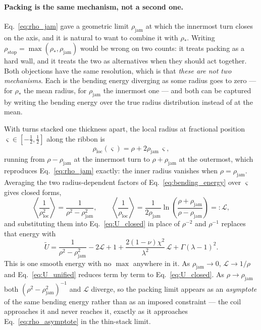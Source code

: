 \documentclass[11pt]{article}
\begin{document}
\paragraph{Packing is the same mechanism, not a second one.} Eq.~\eqref{eq:rho_jam}
gave a geometric limit $\rho_{\mathrm{jam}}$ at which the innermost turn closes on
the axis, and it is natural to want to combine it with $\rho_*$. Writing
$\rho_{\mathrm{stop}} = \max(\rho_*, \rho_{\mathrm{jam}})$ would be wrong on two
counts: it treats packing as a hard wall, and it treats the two as alternatives
when they should act together. Both objections have the same resolution, which is
that \emph{these are not two mechanisms}. Each is the bending energy diverging as
some radius goes to zero --- for $\rho_*$ the mean radius, for
$\rho_{\mathrm{jam}}$ the innermost one --- and both can be captured by writing
the bending energy over the true radius distribution instead of at the mean.

With turns stacked one thickness apart, the local radius at fractional position
$\varsigma \in \left[-\tfrac12, \tfrac12\right]$ along the ribbon is
\begin{equation}\label{eq:rho_local}
    \rho_{\mathrm{loc}}(\varsigma) = \rho + 2\rho_{\mathrm{jam}}\,\varsigma,
\end{equation}
running from $\rho - \rho_{\mathrm{jam}}$ at the innermost turn to
$\rho + \rho_{\mathrm{jam}}$ at the outermost, which reproduces
Eq.~\eqref{eq:rho_jam} exactly: the inner radius vanishes when
$\rho = \rho_{\mathrm{jam}}$. Averaging the two radius-dependent factors of
Eq.~\eqref{eq:bending_energy} over $\varsigma$ gives closed forms,
\begin{equation}\label{eq:rho_averages}
    \left\langle \frac{1}{\rho_{\mathrm{loc}}^{2}} \right\rangle
      = \frac{1}{\rho^{2} - \rho_{\mathrm{jam}}^{2}},
    \qquad
    \left\langle \frac{1}{\rho_{\mathrm{loc}}} \right\rangle
      = \frac{1}{2\rho_{\mathrm{jam}}}
        \ln\!\left(\frac{\rho + \rho_{\mathrm{jam}}}
          {\rho - \rho_{\mathrm{jam}}}\right) =: \mathcal{L},
\end{equation}
and substituting them into Eq.~\eqref{eq:U_closed} in place of $\rho^{-2}$ and
$\rho^{-1}$ replaces that energy with
\begin{equation}\label{eq:U_unified}
    \boxed{\;\tilde U = \frac{1}{\rho^{2}-\rho_{\mathrm{jam}}^{2}}
      - 2\mathcal{L} + 1
      + \frac{2\left(1-\nu\right)\chi^{2}}{\lambda^{2}}\,\mathcal{L}
      + \Gamma\left(\lambda-1\right)^{2} .\;}
\end{equation}
This is one smooth energy with no $\max$ anywhere in it. As
$\rho_{\mathrm{jam}} \to 0$, $\mathcal{L} \to 1/\rho$ and
Eq.~\eqref{eq:U_unified} reduces term by term to Eq.~\eqref{eq:U_closed}. As
$\rho \to \rho_{\mathrm{jam}}$ both $\left(\rho^{2}-\rho_{\mathrm{jam}}^{2}\right)^{-1}$
and $\mathcal{L}$ diverge, so the packing limit appears as an
\emph{asymptote} of the same bending energy rather than as an imposed
constraint --- the coil approaches it and never reaches it, exactly as it
approaches Eq.~\eqref{eq:rho_asymptote} in the thin-stack limit.
\end{document}
